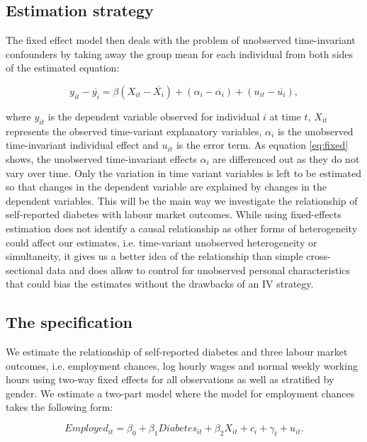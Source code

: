 \subsection{Estimation strategy}

The fixed effect model then deals with the problem of unobserved time-invariant
confounders by taking away the group mean for each individual from
both sides of the estimated equation:

\begin{equation}
y_{it}-\overline{y_{i}}=\beta(X_{it}-\overline{X_{i}})+(\alpha_{i}-\overline{\alpha_{i}})+(u_{it}-\overline{u_{i}}),\label{eq:fixed}
\end{equation}


where $y_{it}$ is the dependent variable observed for individual
$i$ at time $t$, $X_{it}$ represents the observed time-variant
explanatory variables, $\alpha_{i}$ is the unobserved time-invariant
individual effect and $u_{it}$ is the error term. As equation \ref{eq:fixed}
shows, the unobserved time-invariant effects $\alpha_{i}$ are differenced
out as they do not vary over time. Only the variation in time variant
variables is left to be estimated so that changes in the dependent
variable are explained by changes in the dependent variables. This
will be the main way we investigate the relationship of self-reported
diabetes with labour market outcomes. While using fixed-effects estimation
does not identify a causal relationship as other forms of heterogeneity
could affect our estimates, i.e. time-variant unobserved heterogeneity
or simultaneity, it gives us a better idea of the relationship than
simple cross-sectional data and does allow to control for unobserved
personal characteristics that could bias the estimates without the
drawbacks of an \ac{IV} strategy. 




\subsection{The specification}

We estimate the relationship of self-reported diabetes and three labour
market outcomes, i.e. employment chances, log hourly wages  and normal
weekly working hours using two-way fixed effects for all observations
as well as stratified by gender. We estimate a two-part model where
the model for employment chances takes the following form:

\noindent 
\begin{equation}
Employed_{it}=\beta_{0}+\beta_{1}Diabetes_{it}+\beta_{2}X_{it}+c_{i}+\gamma_{t}+u_{it}.\label{eq:employed}
\end{equation}


